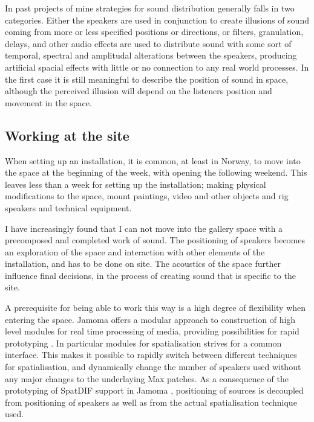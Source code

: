 \documentclass{article}
\begin{document}
In past projects of mine strategies for sound distribution generally falls in two categories. Either the speakers are used in conjunction to create illusions of sound coming from more or less specified positions or directions, or filters, granulation, delays, and other audio effects are used to distribute sound with some sort of temporal, spectral and amplitudal alterations between the speakers, producing artificial spacial effects with little or no connection to any real world processes. In the first case it is still meaningful to describe the position of sound in space, although the perceived illusion will depend on the listeners position and movement in the space.



\subsection{Working at the site}

When setting up an installation, it is common, at least in Norway, to move into the space at the beginning of the week, with opening the following weekend. This leaves less than a week for setting up the installation; making physical modifications to the space, mount paintings, video and other objects and rig speakers and technical equipment. 

I have increasingly found that I can not move into the gallery space with a precomposed and completed work of sound. The positioning of speakers becomes an exploration of the space and interaction with other elements of the installation, and has to be done on site. The acoustics of the space further influence final decisions, in the process of creating sound that is specific to the site.

A prerequisite for being able to work this way is a high degree of flexibility when entering the space. Jamoma offers a modular approach to construction of high level modules for real time processing of media, providing possibilities for rapid prototyping \cite{Place:2006jamoma}. In particular modules for spatialisation strives for a common interface. This makes it possible to rapidly switch between different techniques for spatialisation, and dynamically change the number of speakers used without any major changes to the underlaying Max patches. As a consequence of the prototyping of SpatDIF support in Jamoma \cite{Peters:2008spatdif}, positioning of sources is decoupled from positioning of speakers as well as from the actual spatialisation technique used.
\end{document}

